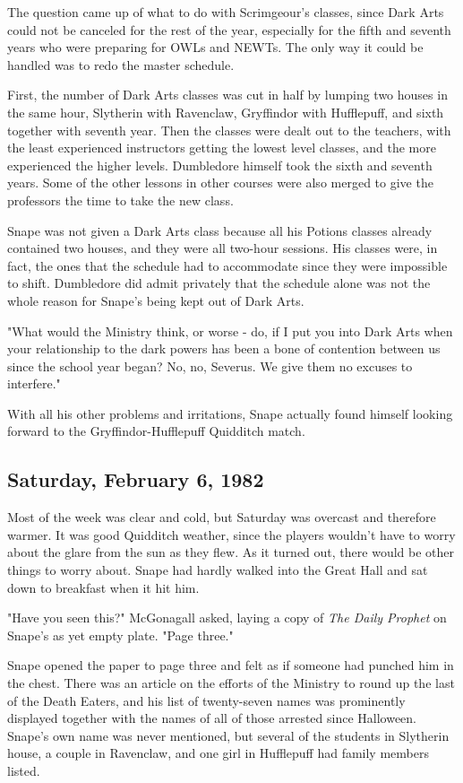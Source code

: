 The question came up of what to do with Scrimgeour's classes, since Dark Arts could not be canceled for the rest of the year, especially for the fifth and seventh years who were preparing for OWLs and NEWTs. The only way it could be handled was to redo the master schedule.

First, the number of Dark Arts classes was cut in half by lumping two houses in the same hour, Slytherin with Ravenclaw, Gryffindor with Hufflepuff, and sixth together with seventh year. Then the classes were dealt out to the teachers, with the least experienced instructors getting the lowest level classes, and the more experienced the higher levels. Dumbledore himself took the sixth and seventh years. Some of the other lessons in other courses were also merged to give the professors the time to take the new class.

Snape was not given a Dark Arts class because all his Potions classes already contained two houses, and they were all two-hour sessions. His classes were, in fact, the ones that the schedule had to accommodate since they were impossible to shift. Dumbledore did admit privately that the schedule alone was not the whole reason for Snape's being kept out of Dark Arts.

"What would the Ministry think, or worse - do, if I put you into Dark Arts when your relationship to the dark powers has been a bone of contention between us since the school year began? No, no, Severus. We give them no excuses to interfere."

With all his other problems and irritations, Snape actually found himself looking forward to the Gryffindor-Hufflepuff Quidditch match.

\subsection{Saturday, February 6, 1982}

Most of the week was clear and cold, but Saturday was overcast and therefore warmer. It was good Quidditch weather, since the players wouldn't have to worry about the glare from the sun as they flew. As it turned out, there would be other things to worry about. Snape had hardly walked into the Great Hall and sat down to breakfast when it hit him.

"Have you seen this?" McGonagall asked, laying a copy of \emph{The Daily Prophet} on Snape's as yet empty plate. "Page three."

Snape opened the paper to page three and felt as if someone had punched him in the chest. There was an article on the efforts of the Ministry to round up the last of the Death Eaters, and his list of twenty-seven names was prominently displayed together with the names of all of those arrested since Halloween. Snape's own name was never mentioned, but several of the students in Slytherin house, a couple in Ravenclaw, and one girl in Hufflepuff had family members listed.

